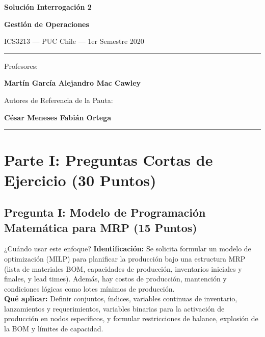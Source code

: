 \documentclass[11pt, a4paper]{article}
\begin{document}
\begin{titlepage}
  \centering
  \vspace*{2cm}
  {\Huge\bfseries\color{gopcyan} Solución Interrogación 2\par}
  \vspace{0.4cm}
  {\LARGE\bfseries Gestión de Operaciones\par}
  \vspace{0.3cm}
  {\large ICS3213 --- PUC Chile --- 1er Semestre 2020\par}
  \vspace{1.2cm}
  \rule{\textwidth}{0.4pt}
  \vspace{0.4cm}

  {\small Profesores:\par}
  {\large\bfseries Martín García \quad Alejandro Mac Cawley\par}
  \vspace{0.3cm}
  {\small Autores de Referencia de la Pauta:\par}
  {\small\textbf{César Meneses \quad Fabián Ortega}\par}
  \vspace{0.4cm}
  \rule{\textwidth}{0.4pt}
  \vspace{1cm}

  \vfill
\end{titlepage}

\newpage

\section{Parte I: Preguntas Cortas de Ejercicio (30 Puntos)}

\subsection*{Pregunta I: Modelo de Programación Matemática para MRP (15 Puntos)}

  \begin{tipprueba}{¿Cuándo usar este enfoque?}
    \textbf{Identificación:} Se solicita formular un modelo de optimización (MILP) para planificar la producción bajo una estructura MRP (lista de materiales BOM, capacidades de producción, inventarios iniciales y finales, y lead times). Además, hay costos de producción, mantención y condiciones lógicas como lotes mínimos de producción.\\
    \textbf{Qué aplicar:} Definir conjuntos, índices, variables continuas de inventario, lanzamientos y requerimientos, variables binarias para la activación de producción en nodos específicos, y formular restricciones de balance, explosión de la BOM y límites de capacidad.
  \end{tipprueba}
\end{document}
